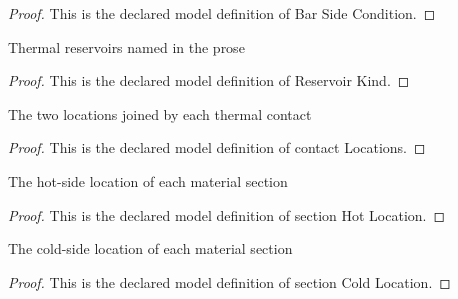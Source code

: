 \begin{proof}
  This is the declared model definition of Bar Side Condition.
\end{proof}
\begin{definition}
  \label{def:physics:phyx-mini-0467:phyxminiproblems-problemphyxmini0467-reservoirkind}
  Thermal reservoirs named in the prose
\end{definition}
\begin{proof}
  This is the declared model definition of Reservoir Kind.
\end{proof}
\begin{definition}
  \label{def:physics:phyx-mini-0467:phyxminiproblems-problemphyxmini0467-contactlocations}
  The two locations joined by each thermal contact
\end{definition}
\begin{proof}
  This is the declared model definition of contact Locations.
\end{proof}
\begin{definition}
  \label{def:physics:phyx-mini-0467:phyxminiproblems-problemphyxmini0467-sectionhotlocation}
  The hot-side location of each material section
\end{definition}
\begin{proof}
  This is the declared model definition of section Hot Location.
\end{proof}
\begin{definition}
  \label{def:physics:phyx-mini-0467:phyxminiproblems-problemphyxmini0467-sectioncoldlocation}
  The cold-side location of each material section
\end{definition}
\begin{proof}
  This is the declared model definition of section Cold Location.
\end{proof}
